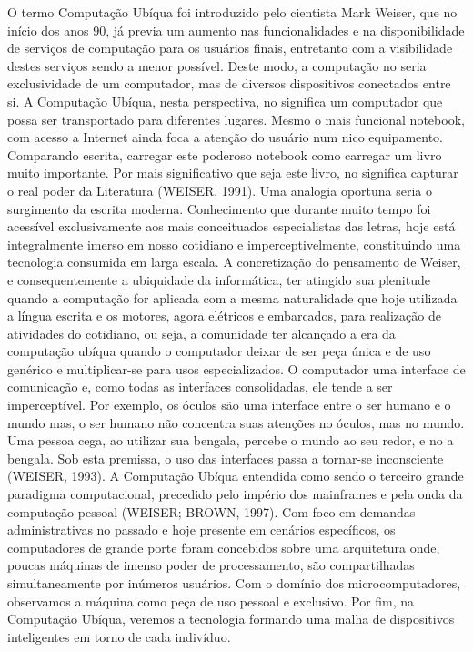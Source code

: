 \documentclass[12pt,a4paper,compsoc]{IEEEtran}
\begin{document}
O termo Computação Ubíqua foi introduzido pelo cientista Mark Weiser, que no início dos anos 90, já previa um aumento nas funcionalidades e na disponibilidade de serviços de computação para os usuários finais, entretanto com a visibilidade destes serviços sendo a menor possível. Deste modo, a computação no seria exclusividade de um computador, mas de diversos dispositivos conectados entre si.
A Computação Ubíqua, nesta perspectiva, no significa um computador que possa ser transportado para diferentes lugares. Mesmo o mais funcional notebook, com acesso a Internet ainda foca a atenção do usuário num nico equipamento. Comparando  escrita, carregar este poderoso notebook  como carregar um livro muito importante. Por mais significativo que seja este livro, no significa capturar o real poder da Literatura (WEISER, 1991).
Uma analogia oportuna seria o surgimento da escrita moderna. Conhecimento que durante muito tempo foi acessível exclusivamente aos mais conceituados especialistas das letras, hoje está integralmente imerso em nosso cotidiano e imperceptivelmente, constituindo uma tecnologia consumida em larga escala.
A concretização do pensamento de Weiser, e consequentemente a ubiquidade da informática, ter atingido sua plenitude quando a computação for aplicada com a mesma naturalidade que hoje  utilizada a língua escrita e os motores, agora elétricos e embarcados, para realização de atividades do cotidiano, ou seja, a comunidade ter alcançado a era da computação ubíqua quando o computador deixar de ser peça única e de uso genérico e multiplicar-se para usos especializados.
O computador uma interface de comunicação e, como todas as interfaces consolidadas, ele tende a ser imperceptível. Por exemplo, os óculos são uma interface entre o ser humano e o mundo mas, o ser humano não concentra suas atenções no óculos, mas no mundo. Uma pessoa cega, ao utilizar sua bengala, percebe o mundo ao seu redor, e no a bengala. Sob esta premissa, o uso das interfaces passa a tornar-se inconsciente (WEISER, 1993).
A Computação Ubíqua entendida como sendo o terceiro grande paradigma computacional, precedido pelo império dos mainframes e pela onda da computação pessoal (WEISER; BROWN, 1997). Com foco em demandas administrativas no passado e hoje presente em cenários específicos, os computadores de grande porte foram concebidos sobre uma arquitetura onde, poucas máquinas de imenso poder de processamento, são compartilhadas simultaneamente por inúmeros usuários. Com o domínio dos microcomputadores, observamos a máquina como peça de uso pessoal e exclusivo. Por fim, na Computação Ubíqua, veremos a tecnologia formando uma malha de dispositivos inteligentes em torno de cada indivíduo.
\end{document}
